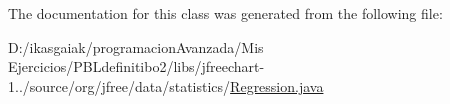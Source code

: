 The documentation for this class was generated from the following file\+:\begin{DoxyCompactItemize}
\item 
D\+:/ikasgaiak/programacion\+Avanzada/\+Mis Ejercicios/\+P\+B\+Ldefinitibo2/libs/jfreechart-\/1../source/org/jfree/data/statistics/\mbox{\hyperlink{_regression_8java}{Regression.\+java}}\end{DoxyCompactItemize}
